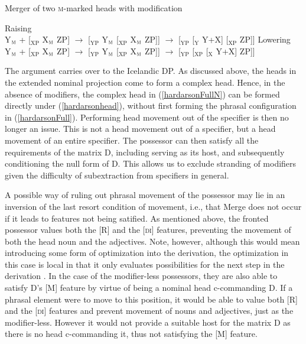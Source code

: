 \documentclass[output=paper,colorlinks,citecolor=brown,
]{langscibook}
\begin{document}
\begin{exe}
	 \citep[468]{hardarson2020} \label{hardarsonhead}
			\begin{xlist}
			\end{xlist}
	\ex	Merger of two \textsc{m}-marked heads with modification \citep[468]{hardarson2020} \label{hardarsonhead+}
		\begin{xlist}
			\ex	Raising\\
				Y$_{\textsc{m}}$ + [$_{\mathrm{XP}}$ X$_{\textsc{m}}$ ZP] $\rightarrow$ [$_{\mathrm{YP}}$ Y$_{\textsc{m}}$ [$_{\mathrm{XP}}$ X$_{\textsc{m}}$ ZP]] $\rightarrow$ [$_{\mathrm{YP}}$ [$_{\mathrm{Y}}$ Y+X] [$_{\mathrm{XP}}$  ZP]]
			\ex Lowering\\
				Y$_{\textsc{m}}$ + [$_{\mathrm{XP}}$ X$_{\textsc{m}}$ ZP] $\rightarrow$ [$_{\mathrm{YP}}$ Y$_{\textsc{m}}$ [$_{\mathrm{XP}}$ X$_{\textsc{m}}$ ZP]] $\rightarrow$ [$_{\mathrm{YP}}$  [$_{\mathrm{XP}}$ [$_{\mathrm{X}}$ Y+X]  ZP]]
		\end{xlist}
\end{exe} 


\noindent The argument carries over to the Icelandic DP. As discussed above, the heads in the extended nominal projection come to form a complex head. Hence, in the absence of modifiers, the complex head in (\ref{hardarsonFullN}) can be formed directly under (\ref{hardarsonhead}), without first forming the phrasal configuration in (\ref{hardarsonFull}). Performing head movement out of the specifier is then no longer an issue. This is not a head movement out of a specifier, but a head movement of an entire specifier. The possessor can then satisfy all the requirements of the matrix D, including serving as its host, and subsequently conditioning the null form of D. This allows us to exclude stranding of modifiers given the difficulty of subextraction from specifiers in general.

A possible way of ruling out phrasal movement of the possessor may lie in an inversion of the last resort condition of movement, i.e., that Merge does not occur if it leads to features not being satified. As mentioned above, the fronted possessor values both the [R] and the [\textsc{di}] features, preventing the movement of both the head noun and the adjectives. Note, however, although this would mean introducing some form of optimization into the derivation, the optimization in this case is local in that it only evaluates possibilities for the next step in the derivation \citep[cf.][]{heck2007,Lahne:2009va}. In the case of the modifier-less possessors, they are also able to satisfy D's [M] feature by virtue of being a nominal head c-commanding D. If a phrasal element were to move to this position, it would be able to value both [R] and the [\textsc{di}] features and prevent movement of nouns and adjectives, just as the modifier-less. However it would not provide a suitable host for the matrix D as there is no head c-commanding it, thus not satisfying the [M] feature.
\end{document}
